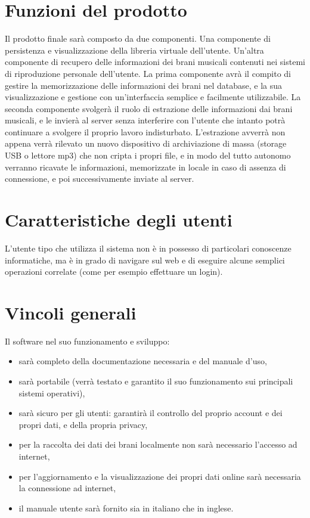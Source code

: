 \section{Funzioni del prodotto}
Il prodotto finale sar\`a composto da due componenti. Una componente di
persistenza e visualizzazione della libreria virtuale dell'utente. Un'altra
componente di recupero delle informazioni dei brani musicali contenuti nei
sistemi di riproduzione personale dell'utente. La prima componente avr\`a il
compito di gestire la memorizzazione delle informazioni dei brani nel database,
e la sua visualizzazione e gestione con un'interfaccia semplice e facilmente
utilizzabile. La seconda componente svolger\`a il ruolo di estrazione delle
informazioni dai brani musicali, e le invier\`a al server senza interferire con
l'utente che intanto potr\`a continuare a svolgere il proprio lavoro indisturbato.
L'estrazione avverr\`a non appena verr\`a rilevato un nuovo dispositivo di
archiviazione di massa (storage USB o lettore mp3) che non cripta i propri file,
e in modo del tutto autonomo verranno ricavate le informazioni, memorizzate in
locale in caso di assenza di connessione, e poi successivamente inviate al server.
\section{Caratteristiche degli utenti}
L'utente tipo che utilizza il sistema non \`e in possesso di particolari
conoscenze informatiche, ma \`e in grado di navigare sul web e di eseguire alcune
semplici operazioni correlate (come per esempio effettuare un login).
\section{Vincoli generali}
Il software nel suo funzionamento e sviluppo:
\begin{itemize}
  \item sar\`a completo della documentazione necessaria e del manuale d'uso,
  \item sar\`a portabile (verr\`a testato e garantito il suo funzionamento sui
  principali sistemi operativi),
  \item sar\`a sicuro per gli utenti: garantir\`a il controllo del proprio account e
  dei propri dati, e della propria privacy,
  \item per la raccolta dei dati dei brani localmente non sar\`a necessario
  l'accesso ad internet,
  \item per l'aggiornamento e la visualizzazione dei propri dati online sar\`a
  necessaria la connessione ad internet,
  \item il manuale utente sar\`a fornito sia in italiano che in inglese.
\end{itemize}

